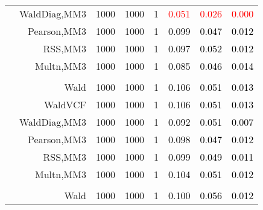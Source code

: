 \documentclass[
]{article}
\begin{document}
\begin{table}[H]
{\begin{tabular}[t]{lrrrrrrr}
\hspace{1em} & WaldDiag,MM3 & 1000 & 1000 & 1 & \textcolor{red}{0.051} & \textcolor{red}{0.026} & \textcolor{red}{0.000}\\

\hspace{1em} & Pearson,MM3 & 1000 & 1000 & 1 & \textcolor{black}{0.099} & \textcolor{black}{0.047} & \textcolor{black}{0.012}\\

\hspace{1em} & RSS,MM3 & 1000 & 1000 & 1 & \textcolor{black}{0.097} & \textcolor{black}{0.052} & \textcolor{black}{0.012}\\

\hspace{1em} & Multn,MM3 & 1000 & 1000 & 1 & \textcolor{black}{0.085} & \textcolor{black}{0.046} & \textcolor{black}{0.014}\\
\cmidrule{1-8}
\addlinespace[0.3em]
\multicolumn{8}{l}{\textbf{1F 15V}}\\
\hspace{1em} & Wald & 1000 & 1000 & 1 & \textcolor{black}{0.106} & \textcolor{black}{0.051} & \textcolor{black}{0.013}\\

\hspace{1em} & WaldVCF & 1000 & 1000 & 1 & \textcolor{black}{0.106} & \textcolor{black}{0.051} & \textcolor{black}{0.013}\\

\hspace{1em} & WaldDiag,MM3 & 1000 & 1000 & 1 & \textcolor{black}{0.092} & \textcolor{black}{0.051} & \textcolor{black}{0.007}\\

\hspace{1em} & Pearson,MM3 & 1000 & 1000 & 1 & \textcolor{black}{0.098} & \textcolor{black}{0.047} & \textcolor{black}{0.012}\\

\hspace{1em} & RSS,MM3 & 1000 & 1000 & 1 & \textcolor{black}{0.099} & \textcolor{black}{0.049} & \textcolor{black}{0.011}\\

\hspace{1em} & Multn,MM3 & 1000 & 1000 & 1 & \textcolor{black}{0.104} & \textcolor{black}{0.051} & \textcolor{black}{0.012}\\
\cmidrule{1-8}
\addlinespace[0.3em]
\multicolumn{8}{l}{\textbf{2F 10V}}\\
\hspace{1em} & Wald & 1000 & 1000 & 1 & \textcolor{black}{0.100} & \textcolor{black}{0.056} & \textcolor{black}{0.012}\\


\end{tabular}}
\end{table}
\end{document}
